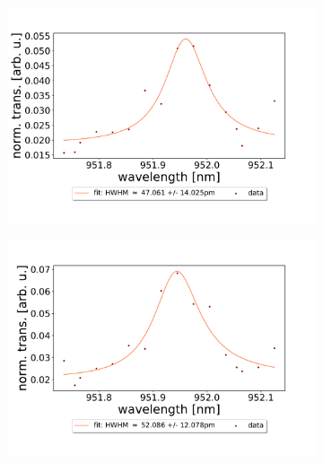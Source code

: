 \begin{figure}[h!] \ContinuedFloat
    \centering
    \begin{subfigure}[b]{0.49\textwidth}
        \includegraphics[width=\textwidth]{figures/results/double fano fits/20250326/83um_M3:M5_fit_7.pdf}
        \caption{}
        \label{fig:83um_M3:M5_fit_7}
    \end{subfigure}
    \begin{subfigure}[b]{0.49\textwidth}
        \includegraphics[width=\textwidth]{figures/results/double fano fits/20250326/83um_M3:M5_fit_8.pdf}
        \caption{}
        \label{fig:83um_M3:M5_fit_8}
    \end{subfigure}
    \begin{subfigure}[b]{0.49\textwidth}

\end{subfigure}
\end{figure}
